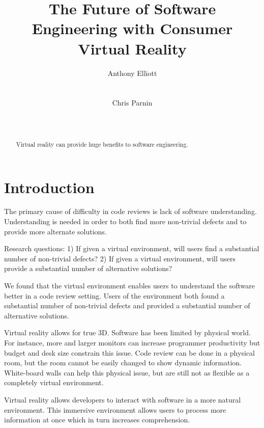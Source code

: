 \documentclass{acm_proc_article-sp}
\begin{document}
\title{The Future of Software Engineering with Consumer Virtual Reality}

\author{
\alignauthor
Anthony Elliott\\
       \\
       \\
\alignauthor
Chris Parnin\\
       \\
       \\
}

\maketitle
\begin{abstract}
Virtual reality can provide huge benefits to software engineering.
\end{abstract}

\section{Introduction}
The primary cause of difficulty in code reviews is lack of software understanding. Understanding is needed in order to both find more non-trivial defects and to provide more alternate solutions.

Research questions:
1) If given a virtual environment, will users find a substantial number of non-trivial defects?
2) If given a virtual environment, will users provide a substantial number of alternative solutions?

We found that the virtual environment enables users to understand the software better in a code review setting. Users of the environment both found a substantial number of non-trivial defects and provided a substantial number of alternative solutions.

Virtual reality allows for true 3D.
Software has been limited by physical world. For instance, more and larger monitors can increase programmer productivity but budget and desk size constrain this issue.
Code review can be done in a physical room, but the room cannot be easily changed to show dynamic information. White-board walls can help this physical issue, but are still not as flexible as a completely virtual environment.

Virtual reality allows developers to interact with software in a more natural environment. This immersive environment allows users to process more information at once which in turn increases comprehension.
\end{document}
